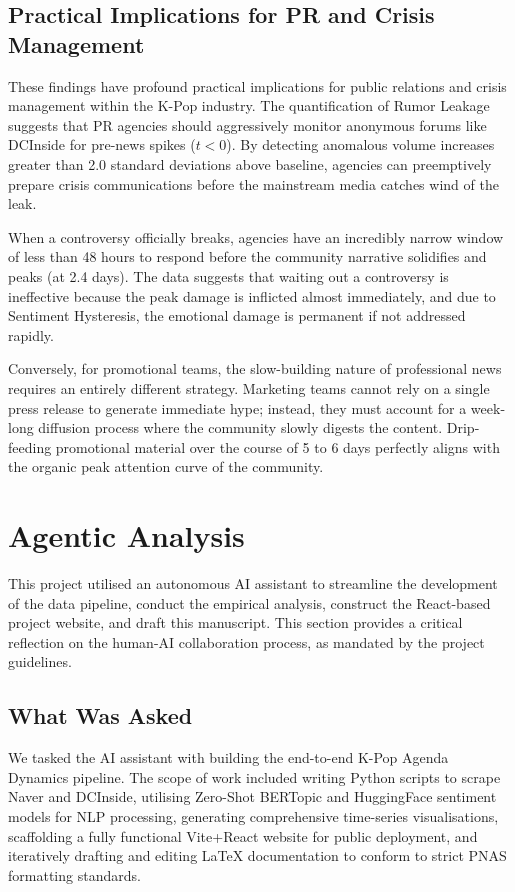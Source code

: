 \documentclass[9pt,twoside,lineno]{pnas-new}
\begin{document}
\begin{article}
\subsection*{Practical Implications for PR and Crisis Management}
These findings have profound practical implications for public relations and crisis management within the K-Pop industry. The quantification of Rumor Leakage suggests that PR agencies should aggressively monitor anonymous forums like DCInside for pre-news spikes ($t < 0$). By detecting anomalous volume increases greater than 2.0 standard deviations above baseline, agencies can preemptively prepare crisis communications before the mainstream media catches wind of the leak.

When a controversy officially breaks, agencies have an incredibly narrow window of less than 48 hours to respond before the community narrative solidifies and peaks (at 2.4 days). The data suggests that waiting out a controversy is ineffective because the peak damage is inflicted almost immediately, and due to Sentiment Hysteresis, the emotional damage is permanent if not addressed rapidly.

Conversely, for promotional teams, the slow-building nature of professional news requires an entirely different strategy. Marketing teams cannot rely on a single press release to generate immediate hype; instead, they must account for a week-long diffusion process where the community slowly digests the content. Drip-feeding promotional material over the course of 5 to 6 days perfectly aligns with the organic peak attention curve of the community.

\section*{Agentic Analysis}
This project utilised an autonomous AI assistant to streamline the development of the data pipeline, conduct the empirical analysis, construct the React-based project website, and draft this manuscript. This section provides a critical reflection on the human-AI collaboration process, as mandated by the project guidelines.

\subsection*{What Was Asked}
We tasked the AI assistant with building the end-to-end K-Pop Agenda Dynamics pipeline. The scope of work included writing Python scripts to scrape Naver and DCInside, utilising Zero-Shot BERTopic and HuggingFace sentiment models for NLP processing, generating comprehensive time-series visualisations, scaffolding a fully functional Vite+React website for public deployment, and iteratively drafting and editing LaTeX documentation to conform to strict PNAS formatting standards.


\end{article}
\end{document}
